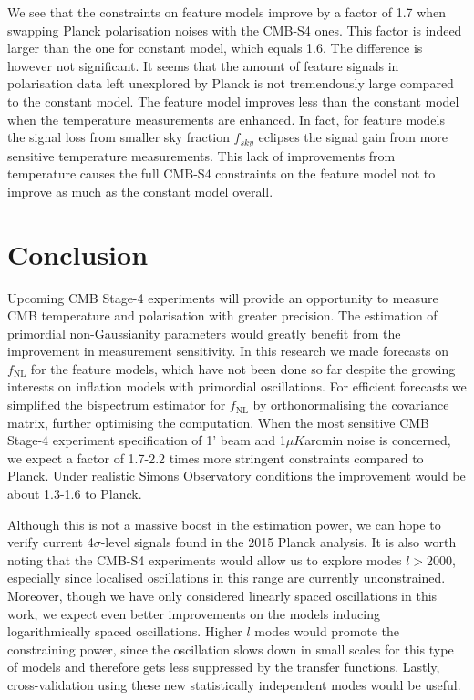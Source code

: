 We see that the constraints on feature models improve by a factor of 1.7 when swapping Planck polarisation noises with the CMB-S4 ones. This factor is indeed larger than the one for constant model, which equals 1.6. The difference is however not significant. It seems that the amount of feature signals in polarisation data left unexplored by Planck is not tremendously large compared to the constant model. The feature model improves less than the constant model when the temperature measurements are enhanced. In fact, for feature models the signal loss from smaller sky fraction $f_{sky}$ eclipses the signal gain from more sensitive temperature measurements. This lack of improvements from temperature causes the full CMB-S4 constraints on the feature model not to improve as much as the constant model overall.


\section{Conclusion} \label{section: conclusion}

Upcoming CMB Stage-4 experiments will provide an opportunity to measure CMB temperature and polarisation with greater precision. The estimation of primordial non-Gaussianity parameters would greatly benefit from the improvement in measurement sensitivity. In this research we made forecasts on $f_\text{NL}$ for the feature models, which have not been done so far despite the growing interests on inflation models with primordial oscillations. For efficient forecasts we simplified the bispectrum estimator for $f_\text{NL}$ by orthonormalising the covariance matrix, further optimising the computation. When the most sensitive CMB Stage-4 experiment specification of 1' beam and 1$\mu K$arcmin noise is concerned, we expect a factor of 1.7-2.2 times more stringent constraints compared to Planck. Under realistic Simons Observatory conditions the improvement would be about 1.3-1.6 to Planck.

Although this is not a massive boost in the estimation power, we can hope to verify current 4$\sigma$-level signals found in the 2015 Planck analysis. It is also worth noting that the CMB-S4 experiments would allow us to explore modes $l>2000$, especially since localised oscillations in this range are currently unconstrained. Moreover, though we have only considered linearly spaced oscillations in this work, we expect even better improvements on the models inducing logarithmically spaced oscillations. Higher $l$ modes would promote the constraining power, since the oscillation slows down in small scales for this type of models and therefore gets less suppressed by the transfer functions. Lastly, cross-validation using these new statistically independent modes would be useful.

